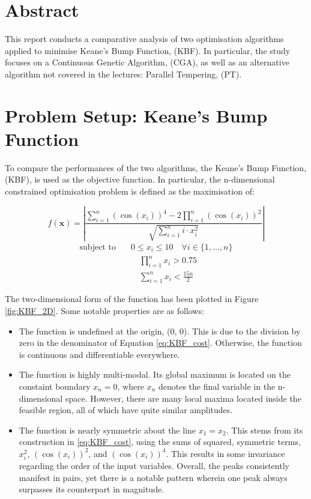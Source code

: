 \documentclass[10pt]{article}
\begin{document}
\begin{multicols}{2}
\section{Abstract}
This report conducts a comparative analysis of two optimisation algorithms applied to minimise Keane's Bump Function, (KBF). In particular, the study focuses on a Continuous Genetic Algorithm, (CGA), as well as an alternative algorithm not covered in the lectures: Parallel Tempering, (PT). 

\section{Problem Setup: Keane's Bump Function}

To compare the performances of the two algorithms, the Keane's Bump Function, (KBF), is used as the objective function. In particular, the n-dimensional constrained optimisation problem is defined as the maximisation of:

\begin{equation}
    f(\mathbf{x}) = \left| \frac{\sum_{i=1}^{n} (\cos(x_i))^4 - 2\prod_{i=1}^{n} (\cos(x_i))^2}{\sqrt{\sum_{i=1}^{n} i \cdot x_i^2}} \right|
    \label{eq:KBF_cost}
\end{equation}
\begin{equation}
    \begin{aligned}
        \text{subject to} \quad & 0 \leq x_i \leq 10 \quad \forall i \in \{1, \dots, n\} \\
        & \quad \prod_{i=1}^{n} x_i > 0.75 \\
        & \quad \sum_{i=1}^{n} x_i < \frac{15n}{2}
    \end{aligned} 
    \label{eq:KBF_constraints}
\end{equation}

The two-dimensional form of the function has been plotted in Figure \ref{fig:KBF_2D}. Some notable properties are as follows:

\begin{itemize}
    \item The function is undefined at the origin, (0, 0). This is due to the division by zero in the denominator of Equation \ref{eq:KBF_cost}. Otherwise, the function is continuous and differentiable everywhere.
    \item The function is highly multi-modal. Its global maximum is located on the constaint boundary $x_{n}=0$, where $x_n$ denotes the final variable in the n-dimensional space. However, there are many local maxima located inside the feasible region, all of which have quite similar amplitudes.
    \item The function is nearly symmetric about the line $x_1=x_2$. This stems from its construction in \ref{eq:KBF_cost}, using the sums of squared, symmetric terms, $x_i^2$, $(\cos(x_i))^2$, and $(\cos(x_i))^4$. This results in some invariance regarding the order of the input variables. Overall, the peaks consistently manifest in pairs, yet there is a notable pattern wherein one peak always surpasses its counterpart in magnitude.
\end{itemize}


\end{multicols}
\end{document}

